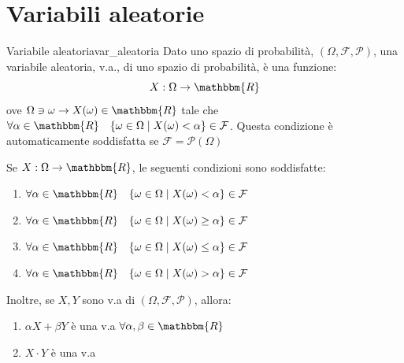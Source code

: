 \documentclass[12pt]{report}
\newcounter{definition}
\newcommand{\nmu}{}
\begin{document}
	\chapter{Variabili aleatorie}
	\begin{definition}{\nmu Variabile aleatoria}{var_aleatoria}
		Dato uno spazio di probabilità, $(\Omega, \mathcal{F}, \mathcal{P})$, una variabile aleatoria, v.a., di uno spazio di probabilità, è una funzione:
		\[
		X: \Omega \to \mathbbm{R}
		\]
		ove $\Omega \ni \omega \to X(\omega) \in \mathbbm{R}$ tale che $\forall \alpha \in \mathbbm{R} \quad \{\omega \in \Omega \mid X(\omega) < \alpha\} \in \mathcal{F}$. Questa condizione è automaticamente soddisfatta se $\mathcal{F} = \mathcal{P}(\Omega)$
 	\end{definition}
 	Se $X: \Omega \to \mathbbm{R}$, le seguenti condizioni sono soddisfatte:
 	\begin{enumerate}
 		\item $\forall \alpha \in \mathbbm{R} \quad \{\omega \in \Omega \mid X(\omega) < \alpha\} \in \mathcal{F}$
 		\item $\forall \alpha \in \mathbbm{R} \quad \{\omega \in \Omega \mid X(\omega)\geq \alpha\} \in \mathcal{F}$
 		\item $\forall \alpha \in \mathbbm{R} \quad \{\omega \in \Omega \mid X(\omega) \leq \alpha\} \in \mathcal{F}$
 		\item $\forall \alpha \in \mathbbm{R} \quad \{\omega \in \Omega \mid X(\omega) > \alpha\} \in \mathcal{F}$
 	\end{enumerate}
 	Inoltre,  se $X, Y$ sono v.a di $(\Omega, \mathcal{F}, \mathcal{P})$, allora:
 	\begin{enumerate}
 		\item $\alpha X + \beta Y$ è una v.a $\forall \alpha, \beta \in \mathbbm{R}$
 		\item $X \cdot Y$ è una v.a
 	\end{enumerate}
\end{document}
